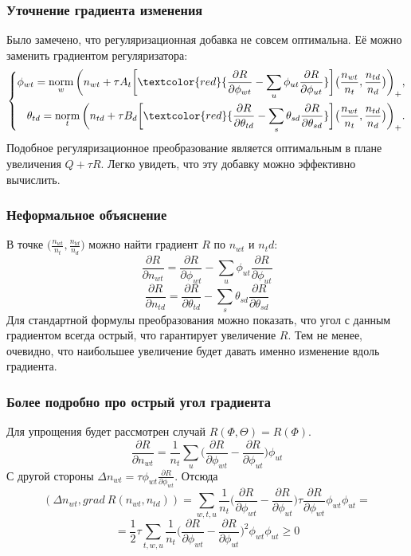 \documentclass[utf8]{beamer}
\DeclareMathOperator{\norm}{norm}
\begin{document}
	\begin{frame}
		\frametitle{Уточнение градиента изменения}
		Было замечено, что регуляризационная добавка не совсем оптимальна. Её можно заменить градиентом регуляризатора:
\[
\left\{
	\begin{aligned}
		\phi_{wt} = \norm_w \bigg( n_{wt} + \tau A_t \bigg[\textcolor{red} {\frac{\partial{R}}{\partial{\phi_{wt}}} - \sum\limits_u \phi_{ut} \frac{\partial{R}}{\partial{\phi_{ut}}} }\bigg] \big(\frac{n_{wt}}{n_t}, \frac{n_{td}}{n_d}\big) \bigg)_{+},\\
		\theta_{td} = \norm_t \bigg(n_{td} + \tau B_d \bigg[ \textcolor{red} {\frac{\partial{R}}{\partial{\theta_{td}}} - \sum\limits_s \theta_{sd} \frac{\partial{R}}{\partial{\theta_{sd}}} }\bigg] \big(\frac{n_{wt}}{n_t}, \frac{n_{td}}{n_d}\big) \bigg)_{+}.
	\end{aligned}
\right.
\]
Подобное регуляризационное преобразование является оптимальным в плане увеличения $Q + \tau R$. Легко увидеть, что эту добавку можно эффективно вычислить.
	\end{frame}
\begin{frame}
		\frametitle{Неформальное объяснение}
В точке  $\bigg( \frac{n_{wt}}{n_t}, \frac{n_{td}}{n_d}\bigg)$ можно найти градиент $R$ по $n_{wt}$ и $n_td$:
\[
\frac{\partial{R}}{\partial{n_{wt}}} = \frac{\partial{R}}{\partial{\phi_{wt}}} - \sum\limits_u \phi_{ut} \frac{\partial{R}}{\partial{\phi_{ut}}}
\]
\[
\frac{\partial{R}}{\partial{n_{td}}} = \frac{\partial{R}}{\partial{\theta_{td}}} - \sum\limits_s \theta_{sd} \frac{\partial{R}}{\partial{\theta_{sd}}}
\]
Для стандартной формулы преобразования можно показать, что угол с данным градиентом всегда острый, что гарантирует увеличение $R$. Тем не менее, очевидно, что наибольшее увеличение будет давать именно изменение вдоль градиента.
	\end{frame}

\begin{frame}
		\frametitle{Более подробно про острый угол градиента}

Для упрощения будет рассмотрен случай $R(\Phi, \Theta) = R(\Phi)$.
\[
\frac{\partial{R}}{\partial{n_{wt}}}  = \frac{1}{n_t} \sum_{u} \bigg(\frac{\partial{R}}{\partial{\phi_{wt}}}  -  \frac{\partial{R}}{\partial{\phi_{ut}}} \bigg)  \phi_{ut}
\]
С другой стороны $\Delta n_{wt} = \tau \phi_{wt} \frac{\partial{R}}{\partial{\phi_{wt}}}$. Отсюда
\[
(\Delta n_{wt}, grad\ R(n_{wt}, n_{td})) = \sum\limits_{w, t, u}  \frac{1}{n_{t}}  \bigg(  \frac{\partial{R}}{\partial{\phi_{wt}}}  -  \frac{\partial{R}}{\partial{\phi_{ut}}}  \bigg)  \tau \frac{\partial{R}}{\partial{\phi_{wt}}} \phi_{wt} \phi_{ut}  = 
\]
\[
= \frac12 \tau \sum\limits_{t, w, u}  \frac{1}{n_{t}} \bigg(  \frac{\partial{R}}{\partial{\phi_{wt}}}  -  \frac{\partial{R}}{\partial{\phi_{ut}}}  \bigg)^2 \phi_{wt} \phi_{ut}  \geq 0
\]
	\end{frame}
\end{document}
